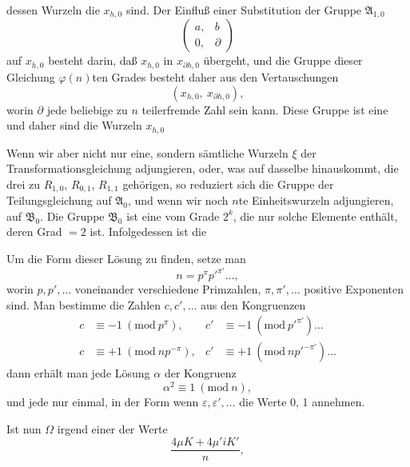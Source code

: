 
dessen Wurzeln die $x_{h,0}$ sind. Der Einfluß einer Substitution der Gruppe
$\mathfrak{A}_{1,0}$
\[
\begin{pmatrix} a, & b \\ 0, & \partial \end{pmatrix}
\]
auf $x_{h,0}$ besteht darin, daß $x_{h,0}$ in $x_{\partial h,0}$ übergeht, und die
Gruppe dieser Gleichung $\varphi(n)$ten Grades besteht daher aus den Vertauschungen
\[
(x_{h,0},\ x_{\partial h,0}),
\]
worin $\partial$ jede beliebige zu $n$ teilerfremde Zahl sein kann. Diese Gruppe ist
eine  und daher sind die Wurzeln $x_{h,0}$ 

Wenn wir aber nicht nur eine, sondern sämtliche Wurzeln $\xi$ der
Transformationsgleichung adjungieren, oder, was auf dasselbe hinauskommt, die drei zu
$R_{1,0}$, $R_{0,1}$, $R_{1,1}$ gehörigen, so reduziert sich die Gruppe der
Teilungsgleichung auf $\mathfrak{A}_0$, und wenn wir noch $n$te Einheitswurzeln
adjungieren, auf $\mathfrak{B}_0$. Die Gruppe $\mathfrak{B}_0$ ist eine  vom
Grade $2^k$, die nur solche Elemente enthält, deren Grad $= 2$ ist. Infolgedessen ist die

Um die Form dieser Lösung zu finden, setze man
\[
n = p^\pi p'^{\pi'} \ldots,
\]
worin $p, p', \ldots$ voneinander verschiedene Primzahlen, $\pi, \pi', \ldots$
positive Exponenten sind. Man bestimme die Zahlen $c, c', \ldots$ aus den Kongruenzen
\[
\begin{aligned}
c &\equiv -1\ (\mathrm{mod}\ p^\pi), & c' &\equiv -1\ (\mathrm{mod}\ p'^{\pi'}) \ldots \\
c &\equiv +1\ (\mathrm{mod}\ np^{-\pi}), & c' &\equiv +1\ (\mathrm{mod}\ np'^{-\pi'}) \ldots
\end{aligned}
\]
dann erhält man jede Lösung $\alpha$ der Kongruenz
\[
\alpha^2 \equiv 1\ (\mathrm{mod}\ n),
\]
und jede nur einmal, in der Form
wenn $\varepsilon, \varepsilon', \ldots$ die Werte 0, 1 annehmen.

Ist nun $\Omega$ irgend einer der Werte
\[
\frac{4\mu K + 4\mu' i K'}{n},
\]
